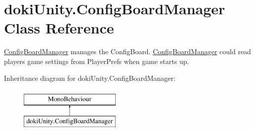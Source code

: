 \hypertarget{classdoki_unity_1_1_config_board_manager}{}\section{doki\+Unity.\+Config\+Board\+Manager Class Reference}
\label{classdoki_unity_1_1_config_board_manager}


\hyperlink{classdoki_unity_1_1_config_board_manager}{Config\+Board\+Manager} manages the Config\+Board. \hyperlink{classdoki_unity_1_1_config_board_manager}{Config\+Board\+Manager} could read player\textquotesingle{}s game settings from Player\+Prefs when game starts up.  


Inheritance diagram for doki\+Unity.\+Config\+Board\+Manager\+:\begin{figure}[H]
\begin{center}
\leavevmode
\includegraphics[height=2.000000cm]{classdoki_unity_1_1_config_board_manager}
\end{center}
\end{figure}
